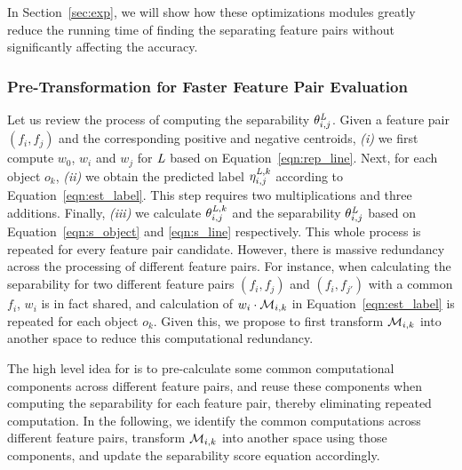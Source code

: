 In Section~\ref{sec:exp}, we will show how these optimizations modules greatly reduce the running time of finding the \topk separating feature pairs without significantly affecting the accuracy.

\subsubsection{Pre-Transformation for Faster Feature Pair Evaluation} \label{ssec:trans}

Let us review the process of computing the separability $\theta_{i,j}^{\mathit{L}}$. Given a feature pair $(f_i,f_j)$ and the corresponding positive and negative centroids, {\em (i)} we first compute $w_0$, $w_i$ and $w_j$ for $\mathit{L}$ based on Equation~\ref{eqn:rep_line}. Next, for each object $o_k$, {\em (ii)} we obtain the predicted label $\eta_{i,j}^{\mathit{L},k}$ according to Equation~\ref{eqn:est_label}. This step requires two multiplications and three additions. Finally, {\em (iii)} we calculate $\theta_{i,j}^{\mathit{L},k}$ and the separability $\theta_{i,j}^{\mathit{L}}$ based on Equation~\ref{eqn:s_object} and \ref{eqn:s_line} respectively. This whole process is repeated for every feature pair candidate. However, there is massive redundancy across the processing of different feature pairs. For instance, when calculating the separability for two different feature pairs $(f_i,f_j)$ and $(f_i,f_{j'})$ with a common $f_i$, $w_i$ is in fact shared, and calculation of $w_i\cdot {\mathcal{M}}_{i,k}$ in Equation~\ref{eqn:est_label} is repeated for each object $o_k$. Given this, we propose to first transform ${\mathcal{M}}_{i,k}$ into another space to reduce this computational redundancy.

 The high level idea for \trans is to pre-calculate some common computational components across different feature pairs, and reuse these components when computing the separability for each feature pair, thereby eliminating repeated computation. In the following, we identify the common computations across different feature pairs, transform ${\mathcal{M}}_{i,k}$ into another space using those components, and update the separability score equation accordingly.

